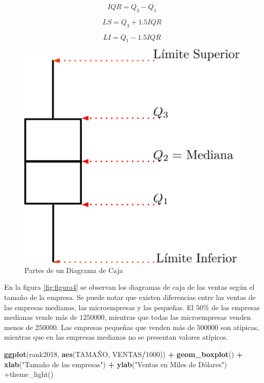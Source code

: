 \documentclass[
]{krantz}
\makeatletter
\newenvironment{Shaded}{\begin{snugshade}}{\end{snugshade}}
\newcommand{\DecValTok}[1]{\textcolor[rgb]{0.06,0.06,0.06}{#1}}
\newcommand{\KeywordTok}[1]{\textcolor[rgb]{0.27,0.27,0.27}{\textbf{#1}}}
\newcommand{\NormalTok}[1]{#1}
\newcommand{\OperatorTok}[1]{\textcolor[rgb]{0.43,0.43,0.43}{\textbf{#1}}}
\newcommand{\StringTok}[1]{\textcolor[rgb]{0.5,0.5,0.5}{#1}}
\newenvironment{kframe}{%
\medskip{}
\setlength{\fboxsep}{.8em}
 \def\at@end@of@kframe{}%
 \ifinner\ifhmode%
  \def\at@end@of@kframe{\end{minipage}}%
  \begin{minipage}{\columnwidth}%
 \fi\fi%
 \def\FrameCommand##1{\hskip\@totalleftmargin \hskip-\fboxsep
 \colorbox{shadecolor}{##1}\hskip-\fboxsep
     \hskip-\linewidth \hskip-\@totalleftmargin \hskip\columnwidth}%
 \MakeFramed {\advance\hsize-\width
   \@totalleftmargin\z@ \linewidth\hsize
   \@setminipage}}%
 {\par\unskip\endMakeFramed%
 \at@end@of@kframe}
\renewenvironment{Shaded}{\begin{kframe}}{\end{kframe}}
\makeatother
\begin{document}
\begin{equation} 
  IQR = Q_3 - Q_1
  \label{eq:iqr}
\end{equation}

\begin{equation} 
  LS = Q_3 + 1.5IQR
  \label{eq:ls}
\end{equation}

\begin{equation} 
  LI = Q_1 - 1.5IQR
  \label{eq:li}
\end{equation}

\begin{figure}[h!]

{\centering \includegraphics[width=0.4\linewidth]{boxplot3} 

}

\caption{Partes de un Diagrama de Caja}\label{fig:caja1}
\end{figure}

En la figura \ref{fig:figura4} se observan los diagramas de caja de las ventas según el tamaño de la empresa. Se puede notar que existen diferencias entre las ventas de las empresas medianas, las microempresas y las pequeñas. El \(50\%\) de las empresas medianas vende más de \(1250000\), mientras que todas las microempresas venden menos de \(250000\). Las empresas pequeñas que venden más de \(500000\) son atípicas, mientras que en las empresas medianas no se presentan valores atípicos.

\begin{Shaded}
\begin{Highlighting}[]
\KeywordTok{ggplot}\NormalTok{(rank2018, }\KeywordTok{aes}\NormalTok{(TAMAÑO, VENTAS}\OperatorTok{/}\DecValTok{1000}\NormalTok{)) }\OperatorTok{+}\StringTok{ }
\StringTok{  }\KeywordTok{geom_boxplot}\NormalTok{() }\OperatorTok{+}\StringTok{ }\KeywordTok{xlab}\NormalTok{(}\StringTok{"Tamaño de las empresas"}\NormalTok{) }\OperatorTok{+}
\StringTok{  }\KeywordTok{ylab}\NormalTok{(}\StringTok{"Ventas en Miles de Dólares") +theme_light()}
\end{Highlighting}
\end{Shaded}
\end{document}
